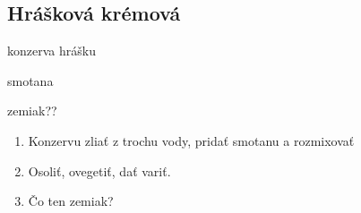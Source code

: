 \setcounter{step}{0}
\subsection{Hrášková krémová}

\begin{ingredient}
\def\portions{4}%

\begin{main}
	\item konzerva hrášku
	\item smotana
	\item zemiak??
\end{main}
\end{ingredient}
\begin{recipe}

\begin{enumerate}

\item{Konzervu zliať z trochu vody, pridať smotanu a rozmixovať}
\item{Osoliť, ovegetiť, dať variť.}
\item{Čo ten zemiak?}	

\end{enumerate}
\end{recipe}

\begin{notes}

\end{notes}
\clearpage	